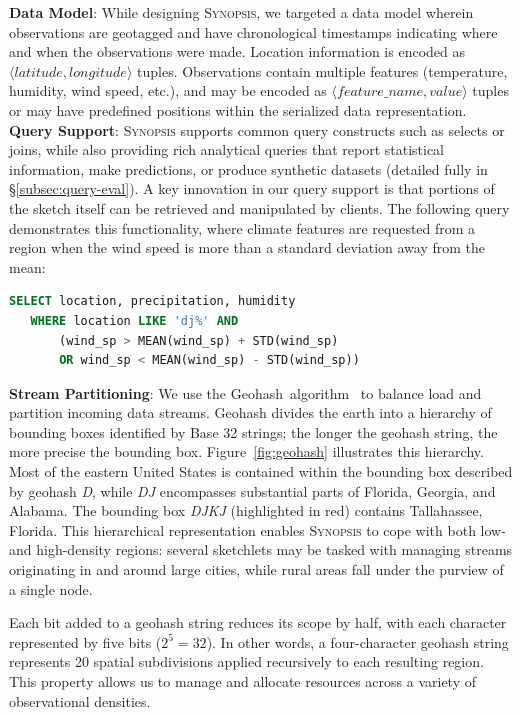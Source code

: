 \documentclass[9pt,journal,compsoc]{IEEEtran}
\begin{document}
%
\textbf{Data Model}:
While designing \textsc{Synopsis}, we targeted a data model wherein observations are geotagged and have chronological timestamps indicating where and when the observations were made. Location information is encoded as $\langle latitude, longitude \rangle$ tuples. Observations contain multiple features (temperature, humidity, wind speed, etc.), and may be encoded as $\langle feature\_name, value \rangle$ tuples or may have predefined positions within the serialized data representation. 
%
\vspace{0.7em}\\
%
\textbf{Query Support}:
\textsc{Synopsis} supports common query constructs such as selects or joins, while also providing rich analytical queries that report statistical information, make predictions, or produce synthetic datasets (detailed fully in \S\ref{subsec:query-eval}). A key innovation in our query support is that portions of the sketch itself can be retrieved and manipulated by clients. The following query demonstrates this functionality, where climate features are requested from a region when the wind speed is more than a standard deviation away from the mean:

\begin{lstlisting}[language=SQL,style=custompy]
   SELECT location, precipitation, humidity
   WHERE location LIKE 'dj%' AND
       (wind_sp > MEAN(wind_sp) + STD(wind_sp)
       OR wind_sp < MEAN(wind_sp) - STD(wind_sp))
\end{lstlisting}
%
%
\textbf{Stream Partitioning}:
We use the Geohash~algorithm~\cite{geohash} to balance load and partition incoming data streams. Geohash divides the earth into a hierarchy of bounding boxes identified by Base 32 strings; the longer the geohash string, the more precise the bounding box. Figure~\ref{fig:geohash} illustrates this hierarchy. Most of the eastern United States is contained within the bounding box described by geohash \emph{D}, while \emph{DJ} encompasses substantial parts of Florida, Georgia, and Alabama. The bounding box \emph{DJKJ} (highlighted in red) contains Tallahassee, Florida. This hierarchical representation enables \textsc{Synopsis} to cope with both low- and high-density regions: several sketchlets may be tasked with managing streams originating in and around large cities, while rural areas fall under the purview of a single node.

Each bit added to a geohash string reduces its scope by half, with each character represented by five bits ($2^5 = 32$). In other words, a four-character geohash string represents 20 spatial subdivisions applied recursively to each resulting region. This property allows us to manage and allocate resources across a variety of observational densities.
\end{document}
